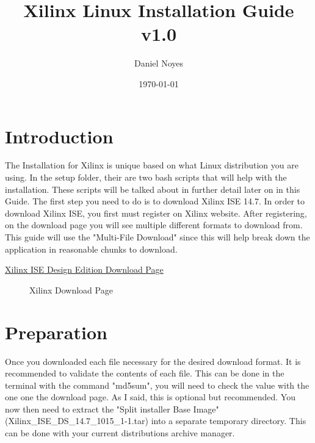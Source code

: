 \documentclass[letter]{article}
\begin{document}
\title{Xilinx Linux Installation Guide\\v1.0}
\author{Daniel Noyes}
\date{\today}
\maketitle
{}

\section{Introduction}
The Installation for Xilinx is unique based on what Linux distribution you are using. In the setup folder, their are two bash scripts that will help with the installation. These scripts will be talked about in further detail later on in this Guide. The first step you need to do is to download Xilinx ISE 14.7. In order to download Xilinx ISE, you first must register on Xilinx website. After registering, on the download page you will see multiple different formats to download from. This guide will use the "Multi-File Download" since this will help break down the application in reasonable chunks to download.

\begin{center}
	\href{http://www.xilinx.com/support/download/index.html/content/xilinx/en/downloadNav/design-tools.html}{Xilinx ISE Design Edition Download Page}
\end{center}

\begin{figure}[!htbp]
  \centering
  \caption{\texttrademark Xilinx Download Page}
\end{figure}

\section{Preparation}
Once you downloaded each file necessary for the desired download format. It is recommended to validate the contents of each file. This can be done in the terminal with the command "md5sum", you will need to check the value with the one one the download page. As I said, this is optional but recommended. You now then need to extract the "Split installer Base Image"(Xilinx\_ISE\_DS\_14.7\_1015\_1-1.tar) into a separate temporary directory. This can be done with your current distributions archive manager.
\end{document}
